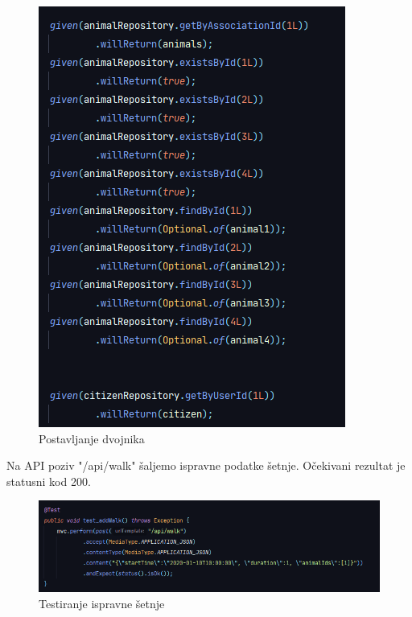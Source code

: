 	\begin{figure}[H]
		\includegraphics[width=\linewidth]{slike/Testovi-5.png}
		\centering
		\caption{Postavljanje dvojnika}
		\label{fig:testovi5}
	\end{figure}

	\noindent Na API poziv "/api/walk" šaljemo ispravne podatke šetnje. Očekivani rezultat je statusni kod 200.

	\begin{figure}[H]
		\includegraphics[width=\linewidth]{slike/Testovi-6.png}
		\centering
		\caption{Testiranje ispravne šetnje}
		\label{fig:testovi6}
	\end{figure}

